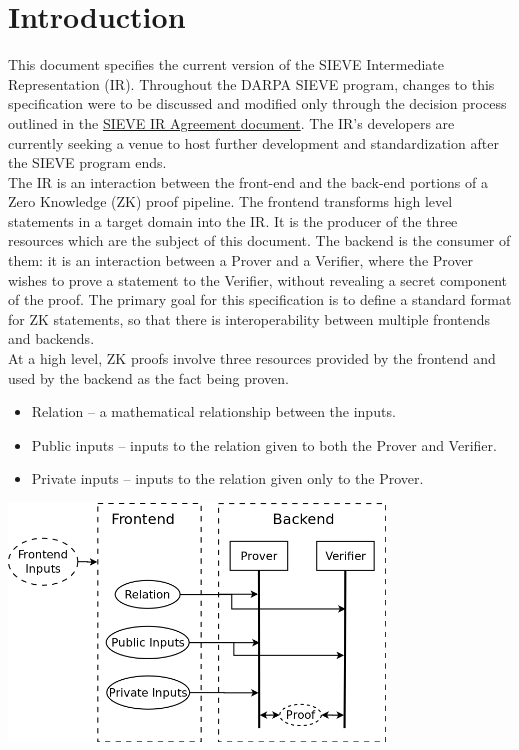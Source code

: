 \section{Introduction}\label{sec:intro}

This document specifies the current version of the SIEVE Intermediate Representation (IR).
 Throughout the DARPA SIEVE program, changes to this specification were to be discussed and modified only through the decision process outlined in the \href{https://docs.google.com/document/d/1imP-9fXy8fQwr1e6ZEuhHnVDGkh1YdUOjEd1ifas6IM/edit?ts=5f614241&pli=1}{SIEVE IR Agreement document}.
The IR's developers are currently seeking a venue to host further development and standardization after the SIEVE program ends.
\\

The IR is an interaction between the front-end and the back-end portions of a Zero Knowledge (ZK) proof pipeline.
The frontend transforms high level statements in a target domain into the IR.
It is the producer of the three resources which are the subject of this document.
The backend is the consumer of them: it is an interaction between a Prover and a Verifier, where the Prover wishes to prove a statement to the Verifier, without revealing a secret component of the proof.
The primary goal for this specification is to define a standard format for ZK statements, so that there is interoperability between multiple frontends and backends.
\\

At a high level, ZK proofs involve three resources provided by the frontend and used by the backend as the fact being proven.

\begin{itemize}
  \item Relation -- a mathematical relationship between the inputs.
  \item Public inputs -- inputs to the relation given to both the Prover and Verifier.
  \item Private inputs -- inputs to the relation given only to the Prover.
\end{itemize}

\noindent \includegraphics[width=0.75\textwidth,center]{ir-dataflow-simple.png} \\

